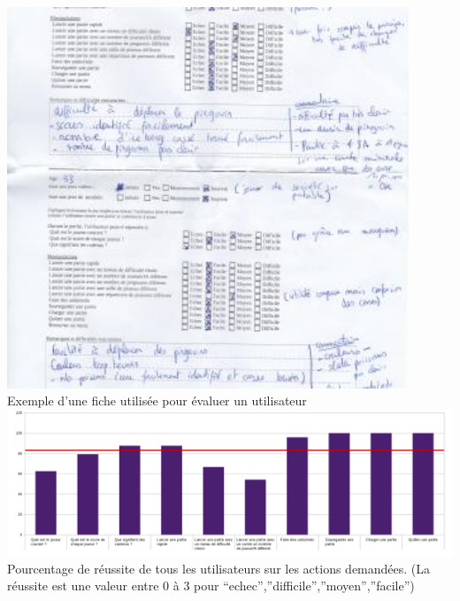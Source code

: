 \documentclass{report}
\begin{document}
\newpage
\begin{center}
  \includegraphics[width=12cm]{image/testut.jpg}
  \\
  Exemple d'une fiche utilisée pour évaluer un utilisateur
  \\
  \vspace{1cm}
  \includegraphics[width=15cm]{image/graphIHM.png}
  \\
  Pourcentage de réussite de tous les utilisateurs sur les actions demandées. (La réussite est une valeur entre 0 à 3 pour ``echec'',''difficile'',''moyen'',''facile'')
\end{center}
\end{document}
